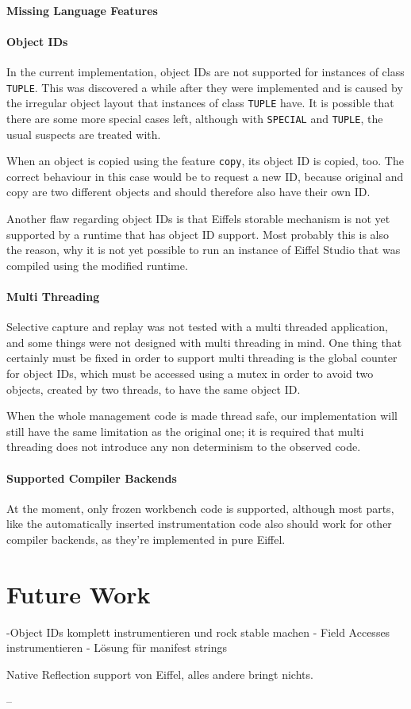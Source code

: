 \paragraph{Missing Language Features}



\paragraph{Object IDs}
In the current implementation, object IDs are not supported for instances of class \texttt{TUPLE}. This was discovered a while after they were implemented and is caused by the irregular object layout that instances of class \texttt{TUPLE} have. It is possible that there are some more special cases left, although with \texttt{SPECIAL} and \texttt{TUPLE}, the usual suspects are treated with.

When an object is copied using the feature \texttt{copy}, its object ID is copied, too. The correct behaviour in this case would be to request a new ID, because original and copy are two different objects and should therefore also have their own ID.

Another flaw regarding object IDs is that Eiffels storable mechanism is not yet supported by a runtime that has object ID support. Most probably this is also the reason, why it is not yet possible to run an instance of Eiffel Studio that was compiled using the modified runtime.

\paragraph{Multi Threading}
Selective capture and replay was not tested with a multi threaded application, and some things were not designed with multi threading in mind. One thing that certainly must be fixed in order to support multi threading is the global counter for object IDs, which must be accessed using a mutex in order to avoid two objects, created by two threads, to have the same object ID.

When the whole management code is made thread safe, our implementation will still have the same limitation as the original one; it is required that multi threading does not introduce any non determinism to the observed code.

\paragraph{Supported Compiler Backends}
At the moment, only frozen workbench code is supported, although most parts, like the automatically inserted instrumentation code also should work for other compiler backends, as they're implemented in pure Eiffel.
\section{Future Work}
-Object IDs komplett instrumentieren und rock stable machen
- Field Accesses instrumentieren
- Lösung für manifest strings

Native Reflection support von Eiffel, alles andere bringt nichts.

--



